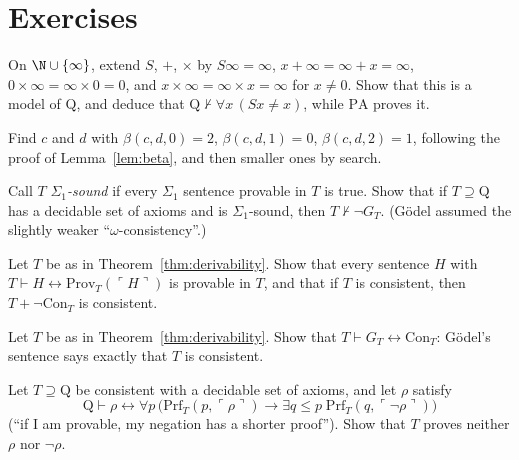 \section{Exercises}

\begin{exercise}[$\star$]\label{ex:qweak}
On $\N\cup\{\infty\}$, extend $S$, $+$, $\times$ by $S\infty=\infty$, $x+\infty=\infty+x=\infty$, $0\times\infty=\infty\times0=0$, and $x\times\infty=\infty\times x=\infty$ for $x\ne0$. Show that this is a model of $\mathrm Q$, and deduce that $\mathrm Q\nvdash\forall x\,(Sx\ne x)$, while $\mathrm{PA}$ proves it.
\end{exercise}

\begin{exercise}[$\star$]\label{ex:betaexample}
Find $c$ and $d$ with $\beta(c,d,0)=2$, $\beta(c,d,1)=0$, $\beta(c,d,2)=1$, following the proof of Lemma~\ref{lem:beta}, and then smaller ones by search.
\end{exercise}

\begin{exercise}[$\star\star$]\label{ex:omegaconsistent}
Call $T$ \emph{$\Sigma_1$-sound} if every $\Sigma_1$ sentence provable in $T$ is true. Show that if $T\supseteq\mathrm Q$ has a decidable set of axioms and is $\Sigma_1$-sound, then $T\nvdash\neg G_T$. (Gödel assumed the slightly weaker ``$\omega$-consistency''.)
\end{exercise}

\begin{exercise}[$\star$]\label{ex:henkin}
Let $T$ be as in Theorem~\ref{thm:derivability}. Show that every sentence $H$ with $T\vdash H\leftrightarrow\mathrm{Prov}_T(\ulcorner H\urcorner)$ is provable in $T$, and that if $T$ is consistent, then $T+\neg\mathrm{Con}_T$ is consistent.
\end{exercise}

\begin{exercise}[$\star\star$]\label{ex:godelsentencefromcon}
Let $T$ be as in Theorem~\ref{thm:derivability}. Show that $T\vdash G_T\leftrightarrow\mathrm{Con}_T$: Gödel's sentence says exactly that $T$ is consistent.
\end{exercise}

\begin{exercise}[$\star\star\star$]\label{ex:rossersentence}
Let $T\supseteq\mathrm Q$ be consistent with a decidable set of axioms, and let $\rho$ satisfy
\[
\mathrm Q\vdash\rho\leftrightarrow\forall p\,\bigl(\mathrm{Prf}_T(p,\ulcorner\rho\urcorner)\to\exists q\le p\;\mathrm{Prf}_T(q,\ulcorner\neg\rho\urcorner)\bigr)
\]
(``if I am provable, my negation has a shorter proof''). Show that $T$ proves neither $\rho$ nor $\neg\rho$.
\end{exercise}

